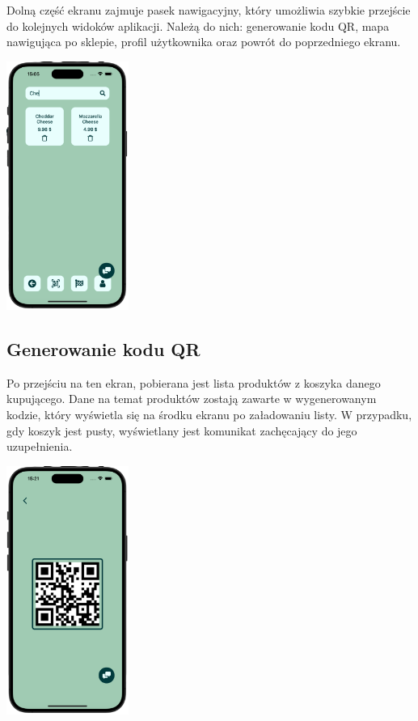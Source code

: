 Dolną część ekranu zajmuje pasek nawigacyjny, który umożliwia szybkie przejście do kolejnych widoków aplikacji. Należą do nich: generowanie kodu QR, mapa nawigująca po sklepie, profil użytkownika oraz powrót do poprzedniego ekranu.

\begin{center}
    \includegraphics[width=0.3\textwidth]{images/front/cart_filtered.png}
\end{center}


\subsection{Generowanie kodu QR}

Po przejściu na ten ekran, pobierana jest lista produktów z koszyka danego kupującego. Dane na temat produktów zostają zawarte w wygenerowanym kodzie, który wyświetla się na środku ekranu po załadowaniu listy. W przypadku, gdy koszyk jest pusty, wyświetlany jest komunikat zachęcający do jego uzupełnienia. 

\begin{center}
    \includegraphics[width=0.3\textwidth]{images/front/qr_page.png}
\end{center}

